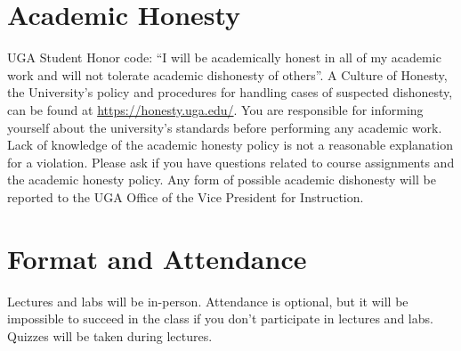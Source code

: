 \documentclass[12pt]{article}
\begin{document}
\section*{\normalsize Academic Honesty}
\vspace{-4mm}

UGA Student Honor code: “I will be
academically honest in all of my academic work and will not tolerate
academic dishonesty of others”. A Culture of Honesty, the University's
policy and procedures for handling cases of suspected dishonesty, can
be found at \url{https://honesty.uga.edu/}. You are responsible for
informing yourself about the university’s standards before performing
any academic work. Lack of knowledge of the academic honesty policy is
not a reasonable explanation for a violation. Please ask if you have
questions related to course assignments and the academic honesty
policy. Any form of possible academic dishonesty will be reported to
the UGA Office of the Vice President for Instruction.

\clearpage

\section*{\normalsize Format and Attendance}
\vspace{-4mm}
Lectures and labs will be in-person. Attendance is optional, but it
will be impossible to succeed in the class if you don't participate in
lectures and labs. Quizzes will be taken during lectures. 

\vspace{-2mm}
\end{document}

